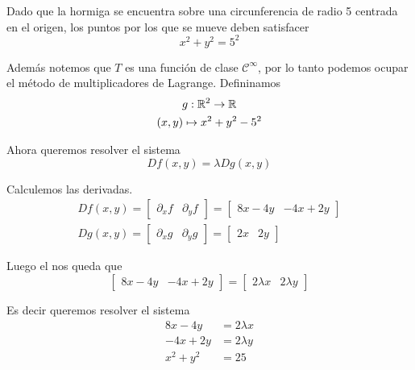 \documentclass[a4paper,oneside,10.5pt]{article}
\begin{document}
\begin{sol}
    Dado que la hormiga se encuentra sobre una circunferencia de radio 5 centrada en el origen, los puntos por los que se mueve deben satisfacer
    \begin{equation*}
        x^2 + y^2 = 5^2
    \end{equation*}

    Además notemos que $T$ es una función de clase $\mathcal{C}^\infty$, por lo tanto podemos ocupar el método de multiplicadores de Lagrange. Defininamos
    \begin{gather*}
        g : \mathbb{R}^2 \to \mathbb{R}\\
        (x, y) \mapsto x^2 + y^2 - 5^2
    \end{gather*}

    Ahora queremos resolver el sistema
    \begin{equation*}
        Df(x, y) = \lambda Dg(x, y)
    \end{equation*}

    Calculemos las derivadas.
    \begin{gather*}
        Df(x, y) = \begin{bmatrix} \partial_x f & \partial_y f \end{bmatrix} = \begin{bmatrix}
            8x - 4y  & -4x + 2y
        \end{bmatrix}\\
        Dg(x, y) = \begin{bmatrix}
            \partial_x g & \partial_y g
        \end{bmatrix} = \begin{bmatrix}
            2x & 2y
        \end{bmatrix}
    \end{gather*}

    Luego el nos queda que
    \begin{equation*}
        \begin{bmatrix}
            8x - 4y  & -4x + 2y
        \end{bmatrix} = \begin{bmatrix}
            2\lambda x & 2 \lambda y
        \end{bmatrix}
    \end{equation*}

    Es decir queremos resolver el sistema
    \begin{align*}
        8x - 4y &= 2\lambda x\\
        -4x + 2y &= 2\lambda y\\
        x^2 + y^2 &= 25
    \end{align*}


\end{sol}
\end{document}
